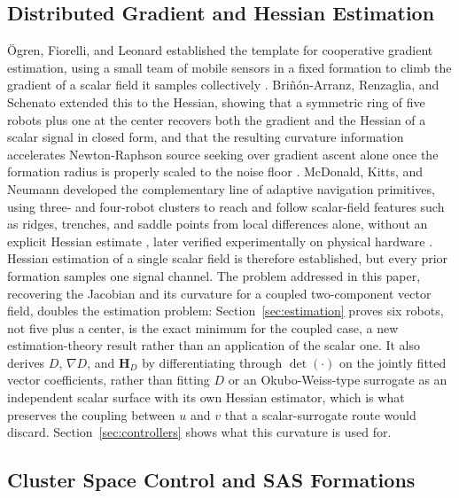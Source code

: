 \documentclass[lettersize,journal]{IEEEtran}
\begin{document}
\subsection{Distributed Gradient and Hessian Estimation}

Ögren, Fiorelli, and Leonard established the template for cooperative
gradient estimation, using a small team of mobile sensors in a fixed
formation to climb the gradient of a scalar field it samples collectively
\cite{26}. Briñón-Arranz, Renzaglia, and Schenato extended this to the Hessian,
showing that a symmetric ring of five robots plus one at the center
recovers both the gradient and the Hessian of a scalar signal in closed
form, and that the resulting curvature information accelerates
Newton-Raphson source seeking over gradient ascent alone once the formation
radius is properly scaled to the noise floor \cite{15}. McDonald, Kitts, and
Neumann developed the complementary line of adaptive navigation primitives,
using three- and four-robot clusters to reach and follow scalar-field
features such as ridges, trenches, and saddle points from local differences
alone, without an explicit Hessian estimate \cite{27,28}, later verified
experimentally on physical hardware \cite{29}. Hessian estimation of a
single scalar field is therefore established, but every prior formation
samples one signal channel. The problem addressed in this paper, recovering
the Jacobian and its curvature for a coupled two-component vector field,
doubles the estimation problem: Section~\ref{sec:estimation} proves six
robots, not five plus a center, is the exact minimum for the coupled case,
a new estimation-theory result rather than an application of the scalar
one. It also derives $D$, $\nabla D$, and $\mathbf{H}_D$ by differentiating
through $\det(\cdot)$ on the jointly fitted vector coefficients, rather than
fitting $D$ or an Okubo-Weiss-type surrogate as an independent scalar
surface with its own Hessian estimator, which is what preserves the
coupling between $u$ and $v$ that a scalar-surrogate route would discard.
Section~\ref{sec:controllers} shows what this curvature is used for.

\subsection{Cluster Space Control and SAS Formations}
\end{document}
